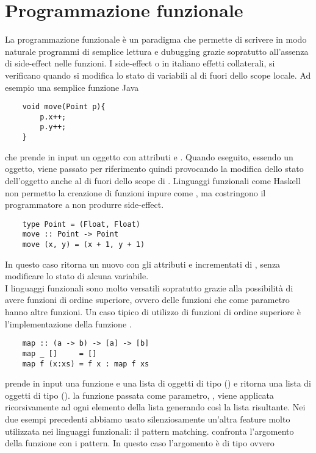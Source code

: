 \section{Programmazione funzionale}
La programmazione funzionale è un paradigma che permette di scrivere in modo naturale programmi di semplice lettura e dubugging grazie sopratutto all'assenza di side-effect nelle funzioni.
I side-effect o in italiano effetti collaterali, si verificano quando si modifica lo stato di variabili al di fuori dello scope locale. Ad esempio una semplice funzione Java
\begin{verbatim}
	void move(Point p){
		p.x++;
		p.y++;
	}
\end{verbatim} 
che prende in input un oggetto  con attributi  e . Quando eseguito, essendo  un oggetto, viene passato per riferimento
quindi provocando la modifica dello stato dell'oggetto anche al di fuori dello scope di . Linguaggi funzionali come Haskell \cite{...} non
permetto la creazione di funzioni inpure come , ma costringono il programmatore a non produrre side-effect.
\begin{verbatim}
	type Point = (Float, Float)
	move :: Point -> Point
	move (x, y) = (x + 1, y + 1)
\end{verbatim}
In questo caso  ritorna un nuovo  con gli attributi  e  incrementati di , senza modificare lo stato di alcuna
variabile.
\\I linguaggi funzionali sono molto versatili sopratutto grazie alla possibilità di avere funzioni di ordine superiore, ovvero delle funzioni che come parametro
hanno altre funzioni. Un caso tipico di utilizzo di funzioni di ordine superiore è l'implementazione della funzione .
\begin{verbatim}
	map :: (a -> b) -> [a] -> [b]
	map _ []     = []
	map f (x:xs) = f x : map f xs
\end{verbatim}
 prende in input una funzione  e una lista di oggetti di tipo  (\code{[a]}) e ritorna una lista di oggetti di tipo  (\code{[b]}). 
la funzione passata come parametro, , viene applicata ricorsivamente ad ogni elemento della lista  generando così la lista risultante. 
Nei due esempi precedenti abbiamo usato silenziosamente un'altra feature molto utilizzata nei linguaggi funzionali: il pattern matching.
 confronta l'argomento della funzione con i pattern. In questo caso l'argomento è di tipo  ovvero
